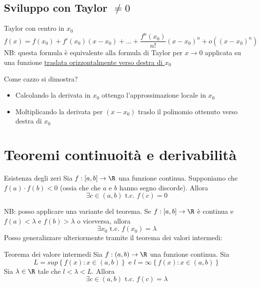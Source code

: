 \subsection{Sviluppo con Taylor $ \neq 0$}
\label{Taylorno0}
\begin{definizione}{Taylor con centro in $x_0$}
	\[
		f\left( x \right) = f\left( x_0 \right) + f'\left( x_0 \right) (x-x_0) + \ldots+ \frac{f^{n}\left( x_0 \right) }{n!}\left( x-x_0 \right) ^{n} + o\left( \left( x-x_0 \right) ^{n} \right)
	\]
	NB: questa formula è equivalente alla formula di Taylor per $ x \to 0$ applicata su una funzione \underline{traslata orizzontalmente verso destra di $x_0$}
\end{definizione}

Come cazzo si dimostra?
\begin{itemize}
	\item Calcolando la derivata in $x_0$ ottengo l'approssimazione locale in $ x_0$
	\item Moltiplicando la derivata per $\left( x-x_0 \right) $ traslo il polinomio ottenuto verso destra di $x_0$
\end{itemize}
\section{Teoremi continuoità e derivabilità}
\begin{teorema}{Esistenza degli zeri}
	Sia $  f: \left[ a,b \right] \to \R $ una funzione continua. Supponiamo che $  f\left( a \right)  \cdot f\left( b \right)  < 0 $ (ossia che che $ a $ e $ b $ hanno segno discorde). Allora
	\[
		\exists c \in  \left( a,b \right) \text{ t.c. } f\left( c  \right) =0
	\]
\end{teorema}

NB: posso applicare una variante del teorema. Se $ f : \left[ a,b \right] \to \R $ è continua e $ f\left( a \right) < \lambda  $ e $ f\left( b \right) > \lambda  $ o viceversa, allora
\[
	\exists x_0  \text{ t.c. } f\left( x_0 \right) = \lambda
\]
Posso generalizzare ulteriormente tramite il teorema dei valori intermedi:

\begin{teorema}{Teorema dei valore intermedi}
	Sia $  f: \left( a,b \right) \to \R $ una funzione continua. Sia \[
		L = sup \left\{ f\left( x \right) : x \in  \left( a,b \right)  \right\} \text{ e } l = \infty\left\{ f\left( x \right) : x \in  \left( a,b \right)  \right\}
	\]
	Sia $ \lambda   \in  \R$ tale che $ l < \lambda  < L $. Allora
	\[
		\exists c \in  \left( a,b \right) \text{ t.c. } f\left( c \right) = \lambda
	\]
\end{teorema}


